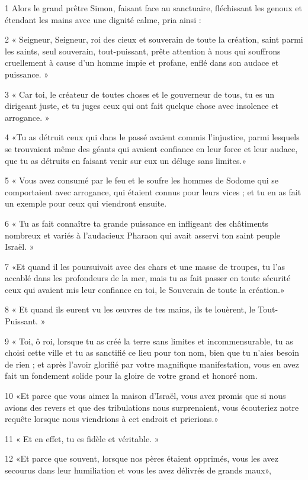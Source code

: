 \par 1 Alors le grand prêtre Simon, faisant face au sanctuaire, fléchissant les genoux et étendant les mains avec une dignité calme, pria ainsi :
\par 2 « Seigneur, Seigneur, roi des cieux et souverain de toute la création, saint parmi les saints, seul souverain, tout-puissant, prête attention à nous qui souffrons cruellement à cause d'un homme impie et profane, enflé dans son audace et puissance. »
\par 3 « Car toi, le créateur de toutes choses et le gouverneur de tous, tu es un dirigeant juste, et tu juges ceux qui ont fait quelque chose avec insolence et arrogance. »
\par 4 «Tu as détruit ceux qui dans le passé avaient commis l'injustice, parmi lesquels se trouvaient même des géants qui avaient confiance en leur force et leur audace, que tu as détruits en faisant venir sur eux un déluge sans limites.»
\par 5 « Vous avez consumé par le feu et le soufre les hommes de Sodome qui se comportaient avec arrogance, qui étaient connus pour leurs vices ; et tu en as fait un exemple pour ceux qui viendront ensuite.
\par 6 « Tu as fait connaître ta grande puissance en infligeant des châtiments nombreux et variés à l'audacieux Pharaon qui avait asservi ton saint peuple Israël. »
\par 7 «Et quand il les poursuivait avec des chars et une masse de troupes, tu l'as accablé dans les profondeurs de la mer, mais tu as fait passer en toute sécurité ceux qui avaient mis leur confiance en toi, le Souverain de toute la création.»
\par 8 « Et quand ils eurent vu les œuvres de tes mains, ils te louèrent, le Tout-Puissant. »
\par 9 « Toi, ô roi, lorsque tu as créé la terre sans limites et incommensurable, tu as choisi cette ville et tu as sanctifié ce lieu pour ton nom, bien que tu n'aies besoin de rien ; et après l'avoir glorifié par votre magnifique manifestation, vous en avez fait un fondement solide pour la gloire de votre grand et honoré nom.
\par 10 «Et parce que vous aimez la maison d'Israël, vous avez promis que si nous avions des revers et que des tribulations nous surprenaient, vous écouteriez notre requête lorsque nous viendrions à cet endroit et prierions.»
\par 11 « Et en effet, tu es fidèle et véritable. »
\par 12 «Et parce que souvent, lorsque nos pères étaient opprimés, vous les avez secourus dans leur humiliation et vous les avez délivrés de grands maux»,
